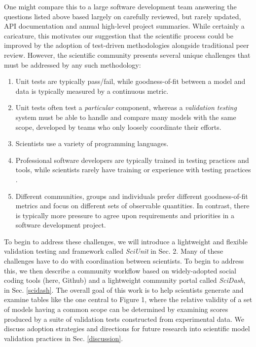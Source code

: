 \documentclass[9pt]{sig-alternate}
\begin{document}
One might compare this to a large software development team answering the questions listed above based largely on carefully reviewed, but rarely updated,  API documentation and annual high-level project summaries.
While certainly a caricature, this motivates our suggestion that the scientific process could be improved by the adoption of test-driven methodologies alongside traditional peer review. However, the scientific community presents several unique challenges that must be addressed by any such methodology:
\begin{enumerate}
\item Unit tests are typically pass/fail, while goodness-of-fit between a model and data is typically measured by a continuous metric. 
\item Unit tests often test a \emph{particular} component, whereas a \emph{validation testing} system must be able to handle and compare many models with the same scope, developed by teams who only loosely coordinate their efforts. %
\item Scientists use a variety of programming languages.
\item Professional software developers are typically trained in testing practices and tools, while scientists  rarely have training or experience with testing practices \cite{oai:open.ac.uk.OAI2:17673}. %
\item Different communities, groups and individuals prefer different goodness-of-fit metrics and focus on different sets of observable quantities. In contrast, there is typically more pressure to agree upon requirements and priorities in a software development project.
\end{enumerate}

To begin to address these challenges, we will introduce a lightweight and flexible validation testing and framework called \textit{SciUnit} in Sec. 2. Many of these challenges have to do with coordination between scientists. To begin to address this, we then describe a community workflow based on widely-adopted social coding tools (here, Github) and a lightweight community portal called \textit{SciDash}, in Sec. \ref{scidash}. The overall goal of this work is to help scientists generate and examine tables like the one central to Figure 1, where the relative validity of a set of models having a common scope can be determined by examining scores produced by a suite of validation tests constructed from experimental data. 
We discuss adoption strategies and directions for future research into scientific model validation practices in Sec. \ref{discussion}.
\end{document}
